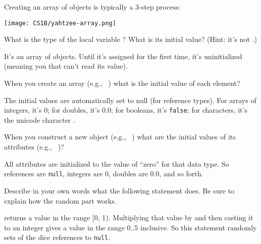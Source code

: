 
Creating an array of objects is typically a 3-step process:

\begin{center}
\texttt{[image: CS1B/yahtzee-array.png]}
\end{center}




\Q What is the type of the local variable ?
What is its initial value? (Hint: it's not .)

\begin{answer}
It's an array of  objects. Until it's assigned for the first time, it's uninitialized (meaning you that can't read its value).
\end{answer}


\Q When you create an array (e.g., ~) what is the initial value of each element?

\begin{answer}
The initial values are automatically set to null (for reference types). For arrays of integers, it's 0; for doubles, it's 0.0; for booleans, it's {\tt false}; for characters, it's the unicode character .
\end{answer}


\Q When you construct a new object (e.g., ~) what are the initial values of its attributes (e.g., ~)?

\begin{answer}
All attributes are initialized to the value of ``zero'' for that data type.
So references are {\tt null}, integers are 0, doubles are 0.0, and so forth.
\end{answer}


\Q Describe in your own words what the following statement does. Be sure to explain how the random part works.

\begin{center}
\end{center}

\begin{answer}
 returns a value in the range [0, 1).
Multiplying that value by  and then casting it to an integer gives a value in the range 0..5 inclusive.
So this statement randomly sets of the dice references to {\tt null}.
\end{answer}


